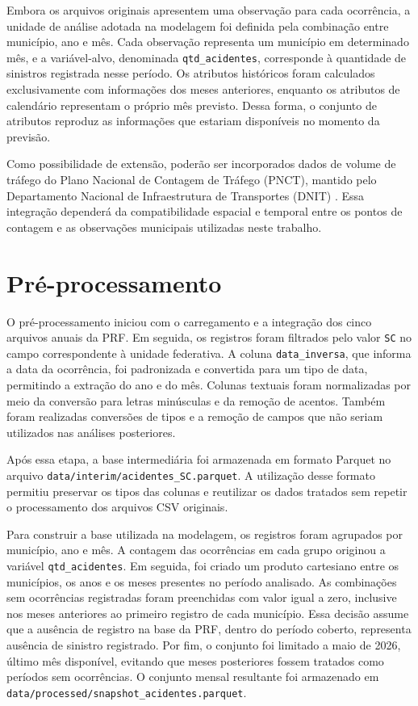 \documentclass[12pt]{article}
\begin{document}
Embora os arquivos originais apresentem uma observação para cada ocorrência, a unidade de análise adotada na modelagem foi definida pela combinação entre município, ano e mês. Cada observação representa um município em determinado mês, e a variável-alvo, denominada \texttt{qtd\_acidentes}, corresponde à quantidade de sinistros registrada nesse período. Os atributos históricos foram calculados exclusivamente com informações dos meses anteriores, enquanto os atributos de calendário representam o próprio mês previsto. Dessa forma, o conjunto de atributos reproduz as informações que estariam disponíveis no momento da previsão.

Como possibilidade de extensão, poderão ser incorporados dados de volume de tráfego do Plano Nacional de Contagem de Tráfego (PNCT), mantido pelo Departamento Nacional de Infraestrutura de Transportes (DNIT) \cite{dnit2026pnct}. Essa integração dependerá da compatibilidade espacial e temporal entre os pontos de contagem e as observações municipais utilizadas neste trabalho.

\section{Pré-processamento}
\label{sec:preprocessamento}

O pré-processamento iniciou com o carregamento e a integração dos cinco arquivos anuais da PRF. Em seguida, os registros foram filtrados pelo valor \texttt{SC} no campo correspondente à unidade federativa. A coluna \texttt{data\_inversa}, que informa a data da ocorrência, foi padronizada e convertida para um tipo de data, permitindo a extração do ano e do mês. Colunas textuais foram normalizadas por meio da conversão para letras minúsculas e da remoção de acentos. Também foram realizadas conversões de tipos e a remoção de campos que não seriam utilizados nas análises posteriores.

Após essa etapa, a base intermediária foi armazenada em formato Parquet no arquivo \texttt{data/interim/acidentes\_SC.parquet}. A utilização desse formato permitiu preservar os tipos das colunas e reutilizar os dados tratados sem repetir o processamento dos arquivos CSV originais.

Para construir a base utilizada na modelagem, os registros foram agrupados por município, ano e mês. A contagem das ocorrências em cada grupo originou a variável \texttt{qtd\_acidentes}. Em seguida, foi criado um produto cartesiano entre os municípios, os anos e os meses presentes no período analisado. As combinações sem ocorrências registradas foram preenchidas com valor igual a zero, inclusive nos meses anteriores ao primeiro registro de cada município. Essa decisão assume que a ausência de registro na base da PRF, dentro do período coberto, representa ausência de sinistro registrado. Por fim, o conjunto foi limitado a maio de 2026, último mês disponível, evitando que meses posteriores fossem tratados como períodos sem ocorrências. O conjunto mensal resultante foi armazenado em \texttt{data/processed/snapshot\_acidentes.parquet}.
\end{document}
